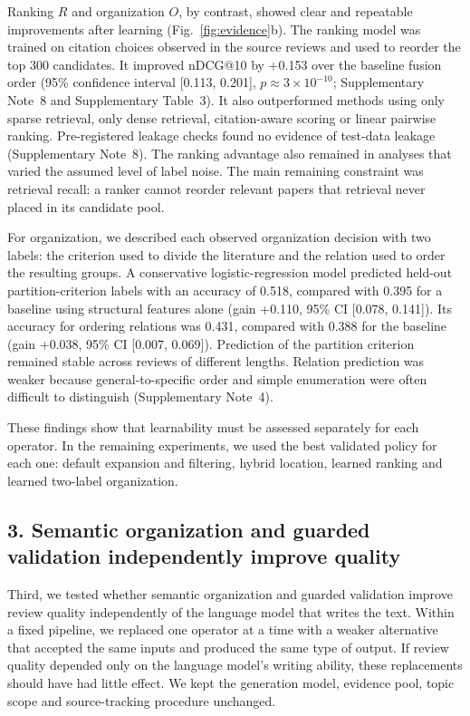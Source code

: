 \documentclass[11pt,a4paper]{article}
\begin{document}
Ranking $R$ and organization $O$, by contrast, showed clear and repeatable improvements after learning (Fig.~\ref{fig:evidence}b). The ranking model was trained on citation choices observed in the source reviews and used to reorder the top 300 candidates. It improved nDCG@10\cite{ndcg} by +0.153 over the baseline fusion order (95\% confidence interval [0.113, 0.201], $p\approx3\times10^{-10}$; Supplementary Note~8 and Supplementary Table~3). It also outperformed methods using only sparse retrieval, only dense retrieval, citation-aware scoring or linear pairwise ranking. Pre-registered leakage checks found no evidence of test-data leakage (Supplementary Note~8). The ranking advantage also remained in analyses that varied the assumed level of label noise. The main remaining constraint was retrieval recall: a ranker cannot reorder relevant papers that retrieval never placed in its candidate pool.

For organization, we described each observed organization decision with two labels: the criterion used to divide the literature and the relation used to order the resulting groups. A conservative logistic-regression model predicted held-out partition-criterion labels with an accuracy of 0.518, compared with 0.395 for a baseline using structural features alone (gain +0.110, 95\% CI [0.078, 0.141]). Its accuracy for ordering relations was 0.431, compared with 0.388 for the baseline (gain +0.038, 95\% CI [0.007, 0.069]). Prediction of the partition criterion remained stable across reviews of different lengths. Relation prediction was weaker because general-to-specific order and simple enumeration were often difficult to distinguish (Supplementary Note~4).

These findings show that learnability must be assessed separately for each operator. In the remaining experiments, we used the best validated policy for each one: default expansion and filtering, hybrid location, learned ranking and learned two-label organization.

\subsection*{3. Semantic organization and guarded validation independently improve quality}

Third, we tested whether semantic organization and guarded validation improve review quality independently of the language model that writes the text. Within a fixed pipeline, we replaced one operator at a time with a weaker alternative that accepted the same inputs and produced the same type of output. If review quality depended only on the language model's writing ability, these replacements should have had little effect. We kept the generation model, evidence pool, topic scope and source-tracking procedure unchanged.
\end{document}
